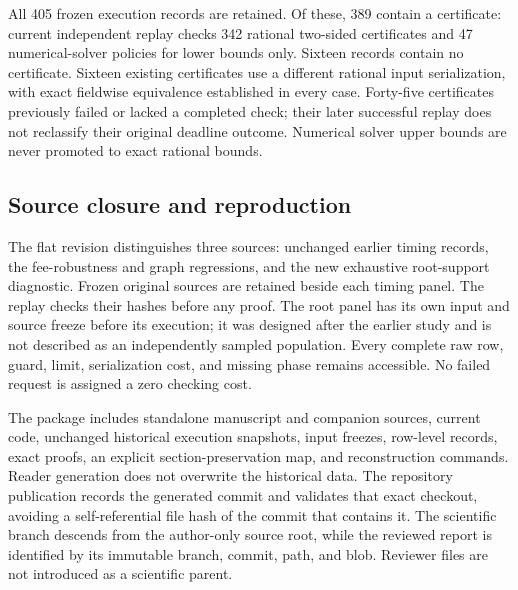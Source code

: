All 405 frozen execution records are retained. Of these, 389 contain a certificate: current independent replay checks 342 rational two-sided certificates and 47 numerical-solver policies for lower bounds only. Sixteen records contain no certificate. Sixteen existing certificates use a different rational input serialization, with exact fieldwise equivalence established in every case. Forty-five certificates previously failed or lacked a completed check; their later successful replay does not reclassify their original deadline outcome. Numerical solver upper bounds are never promoted to exact rational bounds.

\subsection{Source closure and reproduction}
The flat revision distinguishes three sources: unchanged earlier timing records, the fee-robustness and graph regressions, and the new exhaustive root-support diagnostic. Frozen original sources are retained beside each timing panel. The replay checks their hashes before any proof. The root panel has its own input and source freeze before its execution; it was designed after the earlier study and is not described as an independently sampled population. Every complete raw row, guard, limit, serialization cost, and missing phase remains accessible. No failed request is assigned a zero checking cost.

The package includes standalone manuscript and companion sources, current code, unchanged historical execution snapshots, input freezes, row-level records, exact proofs, an explicit section-preservation map, and reconstruction commands. Reader generation does not overwrite the historical data. The repository publication records the generated commit and validates that exact checkout, avoiding a self-referential file hash of the commit that contains it. The scientific branch descends from the author-only source root, while the reviewed report is identified by its immutable branch, commit, path, and blob. Reviewer files are not introduced as a scientific parent.
